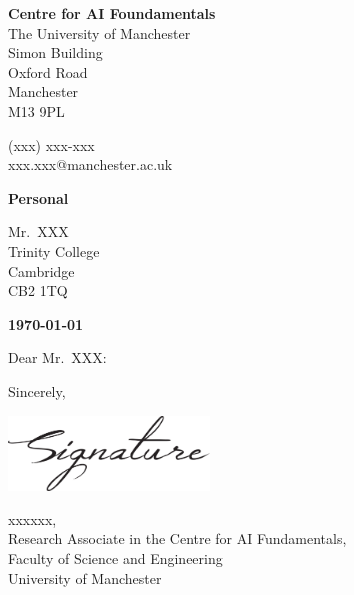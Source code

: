 \documentclass[12pt, a4paper]{letter} %
\begin{document}
\begin{minipage}[t]{0.3\textwidth}
\end{minipage}
\hfill
\begin{minipage}[t]{0.65\textwidth}\raggedright
\raggedleft
\small{
\textbf{\color{uompurple}Centre for AI Foundamentals}\\
\vspace{0.5em}
The University of Manchester\\
Simon Building\\
Oxford Road\\
Manchester\\
M13 9PL

\vspace{0.5em}

(xxx) xxx-xxx\\
xxx.xxx@manchester.ac.uk}
\end{minipage}

\vspace{1em}

\textbf{Personal}

Mr.~XXX\\
Trinity College\\
Cambridge\\
CB2 1TQ

\textbf{\today}

Dear Mr.~XXX:

\lipsum[1-2]

Sincerely,

\includegraphics[width=2.1in]{signature.pdf}

xxxxxx,\\
Research Associate in the Centre for AI Fundamentals,\\
Faculty of Science and Engineering\\
University of Manchester
\end{document}
